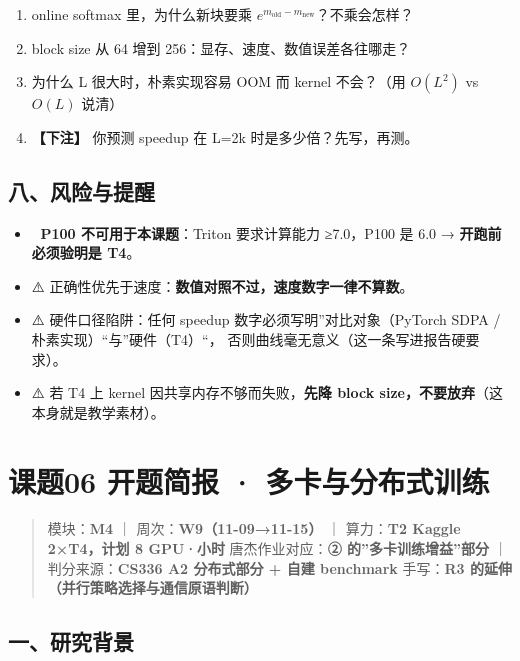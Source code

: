 \documentclass[
  chinese,
  11pt,
]{ctexart}
\providecommand{\tightlist}{%
  \setlength{\itemsep}{0pt}\setlength{\parskip}{0pt}}
\begin{document}
\begin{enumerate}
\def\labelenumi{\arabic{enumi}.}
\tightlist
\item
  online softmax 里，为什么新块要乘 \(e^{m_{\text{old}}-m_{\text{new}}}\)？不乘会怎样？
\item
  block size 从 64 增到 256：显存、速度、数值误差各往哪走？
\item
  为什么 L 很大时，朴素实现容易 OOM 而 kernel 不会？（用 \(O(L^2)\) vs \(O(L)\) 说清）
\item
  \textbf{【下注】} 你预测 speedup 在 L=2k 时是多少倍？先写，再测。
\end{enumerate}

\subsection{八、风险与提醒}\label{ux516bux98ceux9669ux4e0eux63d0ux9192-3}

\begin{itemize}
\tightlist
\item
  🚨 \textbf{P100 不可用于本课题}：Triton 要求计算能力 ≥7.0，P100 是 6.0 → \textbf{开跑前必须验明是 T4}。
\item
  ⚠️ 正确性优先于速度：\textbf{数值对照不过，速度数字一律不算数}。
\item
  ⚠️ 硬件口径陷阱：任何 speedup 数字必须写明''对比对象（PyTorch SDPA / 朴素实现）``与''硬件（T4）``， 否则曲线毫无意义（这一条写进报告硬要求）。
\item
  ⚠️ 若 T4 上 kernel 因共享内存不够而失败，\textbf{先降 block size，不要放弃}（这本身就是教学素材）。
\end{itemize}

\newpage

\section{课题06 开题简报 · 多卡与分布式训练}\label{ux8bfeux989806-ux5f00ux9898ux7b80ux62a5-ux591aux5361ux4e0eux5206ux5e03ux5f0fux8badux7ec3}

\begin{quote}
模块：\textbf{M4} ｜ 周次：\textbf{W9（11-09→11-15）} ｜ 算力：\textbf{T2 Kaggle 2×T4，计划 8 GPU·小时} 唐杰作业对应：\textbf{② 的''多卡训练增益''部分} ｜ 判分来源：\textbf{CS336 A2 分布式部分 + 自建 benchmark} 手写：\textbf{R3 的延伸（并行策略选择与通信原语判断）}
\end{quote}

\subsection{一、研究背景}\label{ux4e00ux7814ux7a76ux80ccux666f-4}
\end{document}
